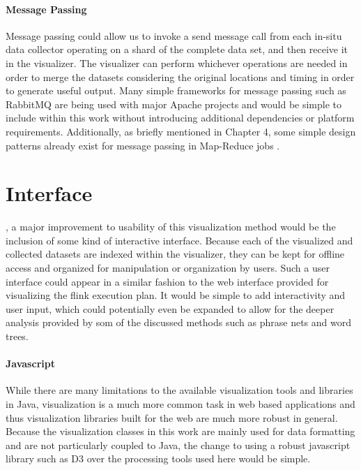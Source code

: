 \paragraph{Message Passing}
Message passing could allow us to invoke a send message call from each in-situ data collector operating on a shard of the complete data set, and then receive it in the visualizer. The visualizer can perform whichever operations are needed in order to merge the datasets considering the original locations and timing in order to generate useful output. Many simple frameworks for message passing such as RabbitMQ are being used with major Apache projects and would be simple to include within this work without introducing additional dependencies or platform requirements. Additionally, as briefly mentioned in Chapter 4, some simple design patterns already exist for message passing in Map-Reduce jobs \cite{Lin2010}.

\section{Interface}
\label{sec:interface}
, a major improvement to usability of this visualization method would be the inclusion of some kind of interactive interface. Because each of the visualized and collected datasets are indexed within the visualizer, they can be kept for offline access and organized for manipulation or organization by users. Such a user interface could appear in a similar fashion to the web interface provided for visualizing the flink execution plan. It would be simple to add interactivity and user input, which could potentially even be expanded to allow for the deeper analysis provided by som of the discussed methods such as phrase nets and word trees.

\paragraph{Javascript}
While there are many limitations to the available visualization tools and libraries in Java, visualization is a much more common task in web based applications and thus visualization libraries built for the web are much more robust in general. Because the visualization classes in this work are mainly used for data formatting and are not particularly coupled to Java, the change to using a robust javascript library such as D3 over the processing tools used here would be simple.